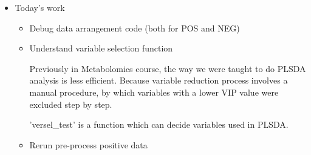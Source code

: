 \begin{itemize}
\begin{itemize}
    \end{itemize}

\item Today's work
    \begin{itemize}
        \item Debug data arrangement code (both for POS and NEG)
        \item Understand variable selection function
        
        Previously in Metabolomics course, the way we were taught to do PLSDA analysis is less efficient. 
        Because variable reduction process involves a manual procedure, by which variables with a lower VIP value were excluded step by step.
        
        'versel\_test' is a function which can decide variables used in PLSDA.
        
        \item Rerun pre-process positive data
    \end{itemize}
    
\end{itemize}











